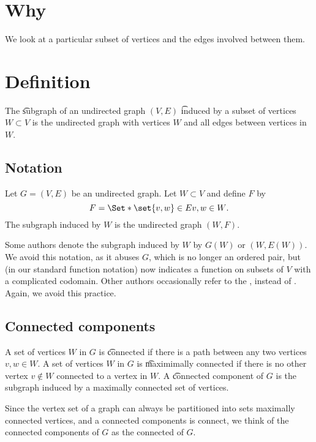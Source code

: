 
\section*{Why}

We look at a particular subset of vertices and the edges involved between them.

\section*{Definition}

The \t{subgraph} of an undirected graph $(V, E)$ \t{induced by} a subset of vertices $W \subset V$ is the undirected graph with vertices $W$ and all edges between vertices in $W$.

\subsection*{Notation}

Let $G = (V, E)$ be an undirected graph.
Let $W \subset V$ and define $F$ by
    \[
F = \Set*{\set{v, w} \in E}{v, w \in W}.
    \]
The subgraph induced by $W$ is the undirected graph $(W, F)$.

Some authors denote the subgraph induced by $W$ by $G(W)$ or $(W, E(W))$.
We avoid this notation, as it abuses $G$, which is no longer an ordered pair, but (in our standard function notation) now indicates a function on subsets of $V$ with a complicated codomain.
Other authors occasionally refer to the , instead of .
Again, we avoid this practice.

\subsection*{Connected components}

A set of vertices $W$ in $G$ is \t{connected} if there is a path between any two vertices $v, w \in W$.
A set of vertices $W$ in $G$ is \t{maximimally connected} if there is no other vertex $v \not \in W$ connected to a vertex in $W$.
A \t{connected component} of $G$ is the subgraph induced by a maximally connected set of vertices.

Since the vertex set of a graph can always be partitioned into sets maximally connected vertices, and a connected components is connect, we think of the connected components of $G$ as the connected  of $G$.

